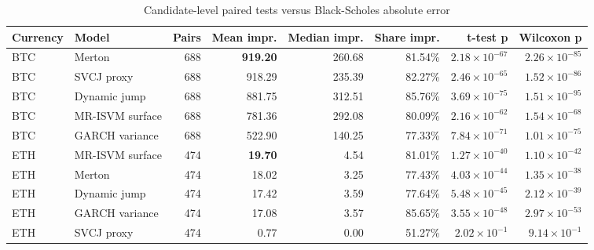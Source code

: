 \documentclass[11pt]{article}
\begin{document}
\begin{table}[H]
\centering
\caption{Candidate-level paired tests versus Black-Scholes absolute error}
\scriptsize
\begin{tabular}{llrrrrrr}
\toprule
Currency & Model & Pairs & Mean impr. & Median impr. & Share impr. & t-test p & Wilcoxon p\\
\midrule
BTC & Merton & 688 & \textbf{919.20} & 260.68 & 81.54\% & $2.18\times10^{-67}$ & $2.26\times10^{-85}$\\
BTC & SVCJ proxy & 688 & 918.29 & 235.39 & 82.27\% & $2.46\times10^{-65}$ & $1.52\times10^{-86}$\\
BTC & Dynamic jump & 688 & 881.75 & 312.51 & 85.76\% & $3.69\times10^{-75}$ & $1.51\times10^{-95}$\\
BTC & MR-ISVM surface & 688 & 781.36 & 292.08 & 80.09\% & $2.16\times10^{-62}$ & $1.54\times10^{-68}$\\
BTC & GARCH variance & 688 & 522.90 & 140.25 & 77.33\% & $7.84\times10^{-71}$ & $1.01\times10^{-75}$\\
ETH & MR-ISVM surface & 474 & \textbf{19.70} & 4.54 & 81.01\% & $1.27\times10^{-40}$ & $1.10\times10^{-42}$\\
ETH & Merton & 474 & 18.02 & 3.25 & 77.43\% & $4.03\times10^{-44}$ & $1.35\times10^{-38}$\\
ETH & Dynamic jump & 474 & 17.42 & 3.59 & 77.64\% & $5.48\times10^{-45}$ & $2.12\times10^{-39}$\\
ETH & GARCH variance & 474 & 17.08 & 3.57 & 85.65\% & $3.55\times10^{-48}$ & $2.97\times10^{-53}$\\
ETH & SVCJ proxy & 474 & 0.77 & 0.00 & 51.27\% & $2.02\times10^{-1}$ & $9.14\times10^{-1}$\\
\bottomrule
\end{tabular}
\end{table}
\end{document}
